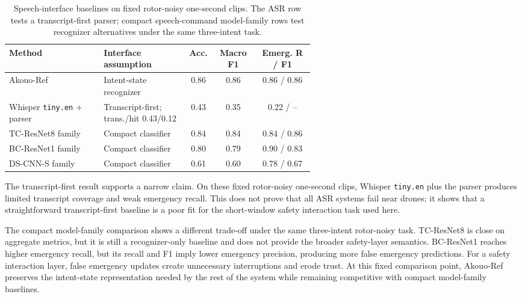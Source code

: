 \begin{table}[t]
    \centering
    \caption{Speech-interface baselines on fixed rotor-noisy one-second clips. The ASR row tests a transcript-first parser; compact speech-command model-family rows test recognizer alternatives under the same three-intent task.}
    \label{tab:speech_interface_baselines}
    \scriptsize
    \setlength{\tabcolsep}{2pt}
    \begin{tabular}{@{}p{0.31\linewidth}p{0.28\linewidth}ccc@{}}
        \toprule
        Method & Interface assumption & Acc. & Macro F1 & Emerg. R / F1 \\
        \midrule
        Akouo-Ref & Intent-state recognizer & 0.86 & 0.86 & 0.86 / 0.86 \\
        Whisper \texttt{tiny.en} + parser & Transcript-first; trans./hit 0.43/0.12 & 0.43 & 0.35 & 0.22 / -- \\
        TC-ResNet8 family & Compact classifier & 0.84 & 0.84 & 0.84 / 0.86 \\
        BC-ResNet1 family & Compact classifier & 0.80 & 0.79 & 0.90 / 0.83 \\
        DS-CNN-S family & Compact classifier & 0.61 & 0.60 & 0.78 / 0.67 \\
        \bottomrule
    \end{tabular}
\end{table}

The transcript-first result supports a narrow claim. On these fixed rotor-noisy one-second clips, Whisper \texttt{tiny.en} plus the parser produces limited transcript coverage and weak emergency recall. This does not prove that all ASR systems fail near drones; it shows that a straightforward transcript-first baseline is a poor fit for the short-window safety interaction task used here.

The compact model-family comparison shows a different trade-off under the same three-intent rotor-noisy task. TC-ResNet8 is close on aggregate metrics, but it is still a recognizer-only baseline and does not provide the broader safety-layer semantics. BC-ResNet1 reaches higher emergency recall, but its recall and F1 imply lower emergency precision, producing more false emergency predictions. For a safety interaction layer, false emergency updates create unnecessary interruptions and erode trust. At this fixed comparison point, Akouo-Ref preserves the intent-state representation needed by the rest of the system while remaining competitive with compact model-family baselines.


